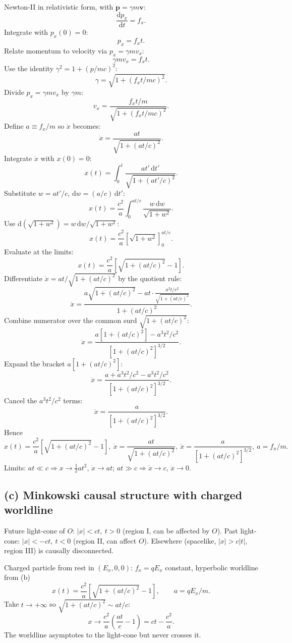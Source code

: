 \documentclass[11pt]{article}
\newcommand{\de}{\mathrm{d}}
\begin{document}
Newton-II in relativistic form, with $\bm p=\gamma m\bm v$:
\[ \frac{\de p_x}{\de t} = f_x. \]
Integrate with $p_x(0)=0$:
\[ p_x = f_x t. \]
Relate momentum to velocity via $p_x = \gamma m v_x$:
\[ \gamma m v_x = f_x t. \]
Use the identity $\gamma^2 = 1 + (p/mc)^2$:
\[ \gamma = \sqrt{1 + (f_x t/mc)^2}. \]
Divide $p_x = \gamma m v_x$ by $\gamma m$:
\[ v_x = \frac{f_x t/m}{\sqrt{1+(f_x t/mc)^2}}. \]
Define $a \equiv f_x/m$ so $\dot x$ becomes:
\[ \dot x = \frac{at}{\sqrt{1+(at/c)^2}}. \]
Integrate $\dot x$ with $x(0)=0$:
\[ x(t) = \int_0^t\frac{a t'\,\de t'}{\sqrt{1+(a t'/c)^2}}. \]
Substitute $w=at'/c$, $\de w=(a/c)\,\de t'$:
\[ x(t) = \frac{c^2}{a}\int_0^{at/c}\frac{w\,\de w}{\sqrt{1+w^2}}. \]
Use $\de(\sqrt{1+w^2}) = w\,\de w/\sqrt{1+w^2}$:
\[ x(t) = \frac{c^2}{a}\left[\sqrt{1+w^2}\right]_0^{at/c}. \]
Evaluate at the limits:
\[ x(t) = \frac{c^2}{a}\left[\sqrt{1+(at/c)^2}-1\right]. \]
Differentiate $\dot x = at/\sqrt{1+(at/c)^2}$ by the quotient rule:
\[ \ddot x = \frac{a\sqrt{1+(at/c)^2} - at\cdot\frac{a^2 t/c^2}{\sqrt{1+(at/c)^2}}}{1+(at/c)^2}. \]
Combine numerator over the common surd $\sqrt{1+(at/c)^2}$:
\[ \ddot x = \frac{a[1+(at/c)^2] - a^3 t^2/c^2}{[1+(at/c)^2]^{3/2}}. \]
Expand the bracket $a[1+(at/c)^2]$:
\[ \ddot x = \frac{a + a^3 t^2/c^2 - a^3 t^2/c^2}{[1+(at/c)^2]^{3/2}}. \]
Cancel the $a^3 t^2/c^2$ terms:
\[ \ddot x = \frac{a}{[1+(at/c)^2]^{3/2}}. \]
Hence
\begin{equation}
\boxed{x(t) = \frac{c^2}{a}\!\left[\sqrt{1+(at/c)^2}-1\right],\ \dot x = \frac{at}{\sqrt{1+(at/c)^2}},\ \ddot x = \frac{a}{[1+(at/c)^2]^{3/2}},\ a=f_x/m.}
\end{equation}
Limits: $at\ll c\Rightarrow x\to\tfrac12 a t^2$, $\dot x\to a t$; $at\gg c\Rightarrow\dot x\to c$, $\ddot x\to 0$.

\subsection*{(c) Minkowski causal structure with charged worldline}

Future light-cone of $O$: $|x|<ct,\ t>0$ (region I, can be affected by $O$). Past light-cone: $|x|<-ct,\ t<0$ (region II, can affect $O$). Elsewhere (spacelike, $|x|>c|t|$, region III) is causally disconnected.

Charged particle from rest in $(E_x,0,0)$: $f_x=qE_x$ constant, hyperbolic worldline from (b)
\[ x(t) = \frac{c^2}{a}\left[\sqrt{1+(at/c)^2}-1\right],\qquad a=qE_x/m. \]
Take $t\to+\infty$ so $\sqrt{1+(at/c)^2}\sim at/c$:
\[ x \to \frac{c^2}{a}\left(\frac{at}{c}-1\right) = ct - \frac{c^2}{a}. \]
The worldline asymptotes to the light-cone but never crosses it.
\end{document}
